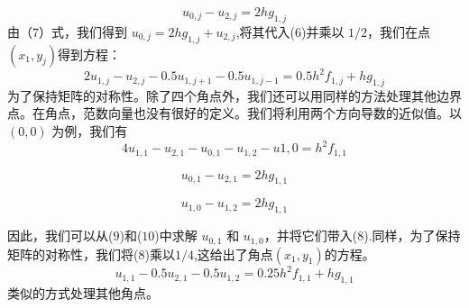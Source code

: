 \documentclass[12pt,a4paper]{article}
\begin{document}
\begin{equation}
u_{0,j}-u_{2,j}=2hg_{1,j}
\end{equation}
由（$7$）式，我们得到 $u_{0,j}=2hg_{1,j}+u_{2,j}$,将其代入($6$)并乘以 $1/2$，我们在点 $(x_1,y_j)$得到方程：
$$
2u_{1,j}-u_{2,j}-0.5u_{1,j+1}-0.5u_{1,j-1}=0.5h^2f_{1,j}+hg_{1,j}
$$
为了保持矩阵的对称性。除了四个角点外，我们还可以用同样的方法处理其他边界点。在角点，范数向量也没有很好的定义。我们将利用两个方向导数的近似值。以 $(0,0)$ 为例，我们有
\begin{equation}
4u_{1,1}-u_{2,1}-u_{0,1}-u_{1,2}-u{1,0}=h^2f_{1,1}
\end{equation}

\begin{equation}
u_{0,1}-u_{2,1}=2hg_{1,1}
\end{equation}

\begin{equation}
u_{1,0}-u_{1,2}=2hg_{1,1}
\end{equation}

因此，我们可以从($9$)和($10$)中求解 $u_{0,1}$ 和 $u_{1,0}$，并将它们带入($8$).同样，为了保持矩阵的对称性，我们将($8$)乘以$1/4$,这给出了角点$(x_1,y_1)$的方程。
$$
u_{1,1}-0.5u_{2,1}-0.5u_{1,2}=0.25h^2f_{1,1}+hg_{1,1}
$$
类似的方式处理其他角点。




\end{document}
